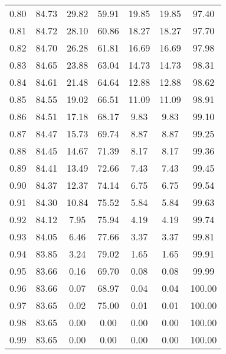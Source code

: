\begin{tabular}{|c|c|c|c|c|c|c|}
      0.80 &     84.73 &     29.82 &      59.91 &   19.85 &      19.85 &         97.40 \\
      0.81 &     84.72 &     28.10 &      60.86 &   18.27 &      18.27 &         97.70 \\
      0.82 &     84.70 &     26.28 &      61.81 &   16.69 &      16.69 &         97.98 \\
      0.83 &     84.65 &     23.88 &      63.04 &   14.73 &      14.73 &         98.31 \\
      0.84 &     84.61 &     21.48 &      64.64 &   12.88 &      12.88 &         98.62 \\
      0.85 &     84.55 &     19.02 &      66.51 &   11.09 &      11.09 &         98.91 \\
      0.86 &     84.51 &     17.18 &      68.17 &    9.83 &       9.83 &         99.10 \\
      0.87 &     84.47 &     15.73 &      69.74 &    8.87 &       8.87 &         99.25 \\
      0.88 &     84.45 &     14.67 &      71.39 &    8.17 &       8.17 &         99.36 \\
      0.89 &     84.41 &     13.49 &      72.66 &    7.43 &       7.43 &         99.45 \\
      0.90 &     84.37 &     12.37 &      74.14 &    6.75 &       6.75 &         99.54 \\
      0.91 &     84.30 &     10.84 &      75.52 &    5.84 &       5.84 &         99.63 \\
      0.92 &     84.12 &      7.95 &      75.94 &    4.19 &       4.19 &         99.74 \\
      0.93 &     84.05 &      6.46 &      77.66 &    3.37 &       3.37 &         99.81 \\
      0.94 &     83.85 &      3.24 &      79.02 &    1.65 &       1.65 &         99.91 \\
      0.95 &     83.66 &      0.16 &      69.70 &    0.08 &       0.08 &         99.99 \\
      0.96 &     83.66 &      0.07 &      68.97 &    0.04 &       0.04 &        100.00 \\
      0.97 &     83.65 &      0.02 &      75.00 &    0.01 &       0.01 &        100.00 \\
      0.98 &     83.65 &      0.00 &       0.00 &    0.00 &       0.00 &        100.00 \\
      0.99 &     83.65 &      0.00 &       0.00 &    0.00 &       0.00 &        100.00 \\
\bottomrule
\end{tabular}
